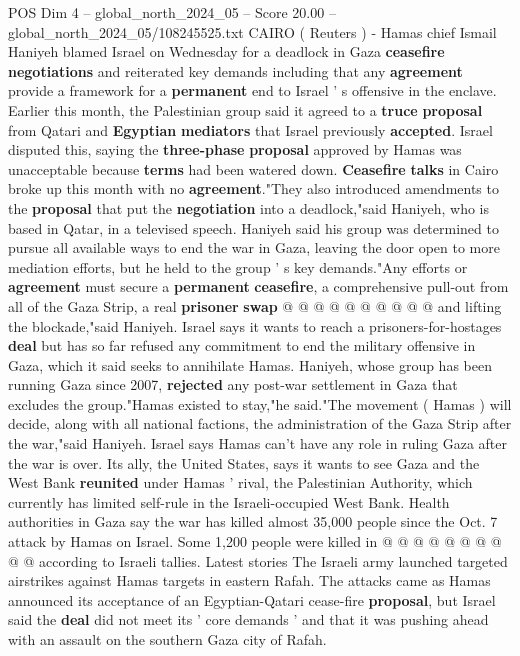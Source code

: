 \begin{textsample}{POS Dim 4 – global\_north\_2024\_05 – Score 20.00 – global\_north\_2024\_05/108245525.txt}  \label{ex:f4_pos_338}
CAIRO ( Reuters ) - Hamas chief Ismail Haniyeh blamed Israel on Wednesday for a deadlock in Gaza \textbf{ceasefire} \textbf{negotiations} and reiterated key demands including that any \textbf{agreement} provide a framework for a \textbf{permanent} end to Israel ' s offensive in the enclave.
Earlier this month, the Palestinian group said it agreed to a \textbf{truce} \textbf{proposal} from Qatari and \textbf{Egyptian} \textbf{mediators} that Israel previously \textbf{accepted}.
Israel disputed this, saying the \textbf{three-phase} \textbf{proposal} approved by Hamas was unacceptable because \textbf{terms} had been watered down. \textbf{Ceasefire} \textbf{talks} in Cairo broke up this month with no \textbf{agreement}."They also introduced amendments to the \textbf{proposal} that put the \textbf{negotiation} into a deadlock,"said Haniyeh, who is based in Qatar, in a televised speech.
Haniyeh said his group was determined to pursue all available ways to end the war in Gaza, leaving the door open to more mediation efforts, but he held to the group ' s key demands."Any efforts or \textbf{agreement} must secure a \textbf{permanent} \textbf{ceasefire}, a comprehensive pull-out from all of the Gaza Strip, a real \textbf{prisoner} \textbf{swap} @ @ @ @ @ @ @ @ @ @ and lifting the blockade,"said Haniyeh.
Israel says it wants to reach a prisoners-for-hostages \textbf{deal} but has so far refused any commitment to end the military offensive in Gaza, which it said seeks to annihilate Hamas.
Haniyeh, whose group has been running Gaza since 2007, \textbf{rejected} any post-war settlement in Gaza that excludes the group."Hamas existed to stay,"he said."The movement ( Hamas ) will decide, along with all national factions, the administration of the Gaza Strip after the war,"said Haniyeh.
Israel says Hamas can't have any role in ruling Gaza after the war is over.
Its ally, the United States, says it wants to see Gaza and the West Bank \textbf{reunited} under Hamas ' rival, the Palestinian Authority, which currently has limited self-rule in the Israeli-occupied West Bank.
Health authorities in Gaza say the war has killed almost 35,000 people since the Oct. 7 attack by Hamas on Israel.
Some 1,200 people were killed in @ @ @ @ @ @ @ @ @ @ according to Israeli tallies.
Latest stories The Israeli army launched targeted airstrikes against Hamas targets in eastern Rafah.
The attacks came as Hamas announced its acceptance of an Egyptian-Qatari cease-fire \textbf{proposal}, but Israel said the \textbf{deal} did not meet its ' core demands ' and that it was pushing ahead with an assault on the southern Gaza city of Rafah.

\end{textsample}
